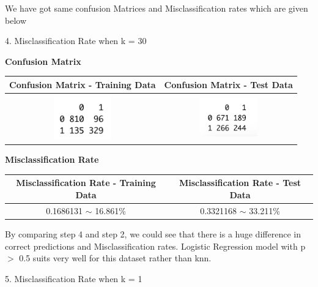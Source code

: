 \documentclass[a4paper,10pt]{article}
\begin{document}
We have got same confusion Matrices and Misclassification rates which are given below \par
4. Misclassification Rate when k = 30 \par
\begin{center}
	\textbf{Confusion Matrix} \par
	\begin{tabular}{|c|c|}
		\hline
		Confusion Matrix - Training Data&
		Confusion Matrix - Test Data\\
		\hline
		\cellcolor{yellow!100} \includegraphics[width=25mm,scale=0.10]{Confusion_Matrix_knn_training_Data_1.png} &
		\cellcolor{yellow!100} \includegraphics[width=25mm,scale=0.10]{Confusion_Matrix_knn_test_Data_1.png}\\
		\hline
	\end{tabular}\par \par
	\textbf{Misclassification Rate} \par
	\begin{tabular}{|c|c|}
		\hline
		Misclassification Rate - Training Data&
		Misclassification Rate - Test Data\\
		\hline
		\cellcolor{yellow!100} 0.1686131 $\sim$ 16.861\% & \cellcolor{yellow!100} 0.3321168 $\sim$ 33.211\%\\
		\hline
	\end{tabular}\par
\end{center}\par
By comparing step 4 and step 2, we could see that there is a huge difference in correct predictions and Misclassification rates.
Logistic Regression model with p $>$ 0.5 suits very well for this dataset rather than knn. \par
\vspace{0.5cm}
5. Misclassification Rate when k = 1 \par
\end{document}
